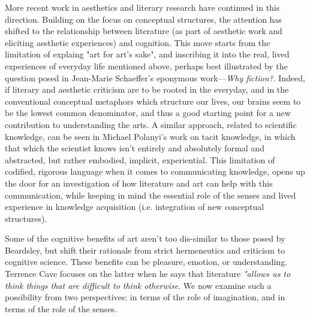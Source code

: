 \documentclass{article}
\begin{document}
More recent work in aesthetics and literary research have continued in this direction. Building on the focus on conceptual structures, the attention has shifted to the relationship between literature (as part of aesthetic work and eliciting aesthetic experiences) and cognition. This move starts from the limitation of explaing "art for art's sake", and inscribing it into the real, lived experiences of everyday life mentioned above, perhaps best illustrated by the question posed in Jean-Marie Schaeffer's eponymous work—\emph{Why fiction?}. Indeed, if literary and aesthetic criticism are to be rooted in the everyday, and in the conventional conceptual metaphors which structure our lives, our brains seem to be the lowest common denominator, and thus a good starting point for a new contribution to understanding the arts. A similar approach, related to scientific knowledge, can be seen in Michael Polanyi's work on tacit knowledge, in which that which the scientist knows isn't entirely and absolutely formal and abstracted, but rather embodied, implicit, experiential. This limitation of codified, rigorous language when it comes to communicating knowledge, opens up the door for an investigation of how literature and art can help with this communication, while keeping in mind the essential role of the senses and lived experience in knowledge acquisition (i.e. integration of new conceptual structures)\cite{polanyi_tacit_2009}.

Some of the cognitive benefits of art aren't too dis-similar to those posed by Beardsley, but shift their rationale from strict hermeneutics and criticism to cognitive science. These benefits can be pleasure, emotion, or understanding. Terrence Cave focuses on the latter when he says that literature \emph{"allows us to think things that are difficult to think otherwise}. We now examine such a possibility from two perspectives: in terms of the role of imagination, and in terms of the role of the senses.
\end{document}
